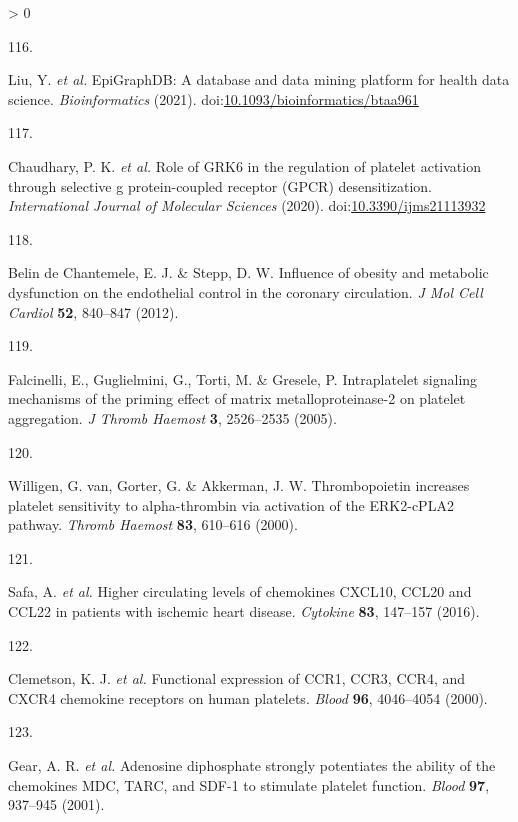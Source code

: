 \documentclass[11pt,twoside]{bristolthesis}
\newlength{\cslhangindent}
\newlength{\csllabelwidth}
\newenvironment{CSLReferences}[2] %
 {%
  \setlength{\parindent}{0pt}
  \ifodd #1 \everypar{\setlength{\hangindent}{\cslhangindent}}\ignorespaces\fi
  \ifnum #2 > 0
  \setlength{\parskip}{#2\baselineskip}
  \fi
 }%
 {}
\newcommand{\CSLLeftMargin}[1]{\parbox[t]{\csllabelwidth}{#1}}
\newcommand{\CSLRightInline}[1]{\parbox[t]{\linewidth - \csllabelwidth}{#1}\break}
\begin{document}
\begin{CSLReferences}{0}{0}
\leavevmode\hypertarget{ref-Liu2021}{}%
\CSLLeftMargin{116. }
\CSLRightInline{Liu, Y. \emph{et al.} {EpiGraphDB: A database and data mining platform for health data science}. \emph{Bioinformatics} (2021). doi:\href{https://doi.org/10.1093/bioinformatics/btaa961}{10.1093/bioinformatics/btaa961}}

\leavevmode\hypertarget{ref-Chaudhary2020}{}%
\CSLLeftMargin{117. }
\CSLRightInline{Chaudhary, P. K. \emph{et al.} {Role of GRK6 in the regulation of platelet activation through selective g protein-coupled receptor (GPCR) desensitization}. \emph{International Journal of Molecular Sciences} (2020). doi:\href{https://doi.org/10.3390/ijms21113932}{10.3390/ijms21113932}}

\leavevmode\hypertarget{ref-BelindeChantemele2012a}{}%
\CSLLeftMargin{118. }
\CSLRightInline{Belin de Chantemele, E. J. \& Stepp, D. W. {Influence of obesity and metabolic dysfunction on the endothelial control in the coronary circulation}. \emph{J Mol Cell Cardiol} \textbf{52}, 840--847 (2012).}

\leavevmode\hypertarget{ref-Falcinelli2005}{}%
\CSLLeftMargin{119. }
\CSLRightInline{Falcinelli, E., Guglielmini, G., Torti, M. \& Gresele, P. {Intraplatelet signaling mechanisms of the priming effect of matrix metalloproteinase-2 on platelet aggregation}. \emph{J Thromb Haemost} \textbf{3}, 2526--2535 (2005).}

\leavevmode\hypertarget{ref-VanWilligen2000}{}%
\CSLLeftMargin{120. }
\CSLRightInline{Willigen, G. van, Gorter, G. \& Akkerman, J. W. {Thrombopoietin increases platelet sensitivity to alpha-thrombin via activation of the ERK2-cPLA2 pathway}. \emph{Thromb Haemost} \textbf{83}, 610--616 (2000).}

\leavevmode\hypertarget{ref-Safa2016}{}%
\CSLLeftMargin{121. }
\CSLRightInline{Safa, A. \emph{et al.} {Higher circulating levels of chemokines CXCL10, CCL20 and CCL22 in patients with ischemic heart disease}. \emph{Cytokine} \textbf{83}, 147--157 (2016).}

\leavevmode\hypertarget{ref-Clemetson2000}{}%
\CSLLeftMargin{122. }
\CSLRightInline{Clemetson, K. J. \emph{et al.} {Functional expression of CCR1, CCR3, CCR4, and CXCR4 chemokine receptors on human platelets}. \emph{Blood} \textbf{96}, 4046--4054 (2000).}

\leavevmode\hypertarget{ref-Gear2001}{}%
\CSLLeftMargin{123. }
\CSLRightInline{Gear, A. R. \emph{et al.} {Adenosine diphosphate strongly potentiates the ability of the chemokines MDC, TARC, and SDF-1 to stimulate platelet function}. \emph{Blood} \textbf{97}, 937--945 (2001).}


\end{CSLReferences}
\end{document}
